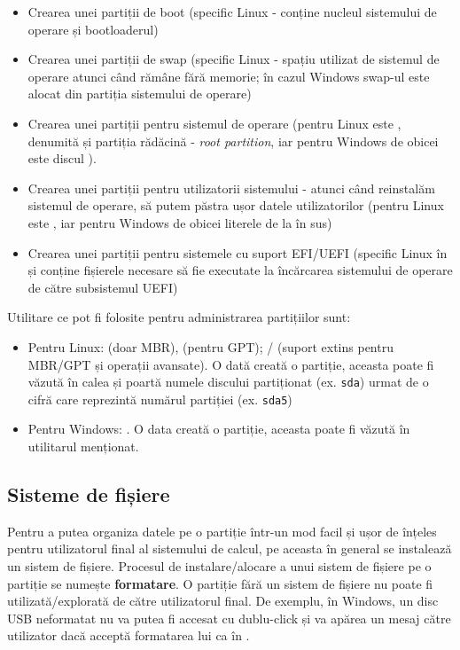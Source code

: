 \begin{itemize}
  \item Crearea unei partiții de boot (specific Linux  - conține
		nucleul sistemului de operare și bootloaderul)
	\item Crearea unei partiții de swap (specific Linux - spațiu utilizat de
		sistemul de operare atunci când rămâne fără memorie; în cazul
		Windows swap-ul este alocat din partiția sistemului de operare)
	\item Crearea unei partiții pentru sistemul de operare (pentru Linux
          este \file{/}, denumită și partiția rădăcină - \textit{root partition}, iar pentru Windows de obicei este
                discul ).
	\item Crearea unei partiții pentru utilizatorii sistemului - atunci când
		reinstalăm sistemul de operare, să putem păstra ușor datele
                utilizatorilor (pentru Linux este , iar pentru Windows de
                obicei literele de la  în sus)
	\item Crearea unei partiții pentru sistemele cu suport EFI/UEFI
          (specific Linux în  și conține fișierele necesare să
		fie executate la încărcarea sistemului de operare de către
		subsistemul UEFI)
\end{itemize}

Utilitare ce pot fi folosite pentru administrarea partițiilor sunt:

\begin{itemize}
  \item Pentru Linux:  (doar MBR),  (pentru GPT); / (suport extins
		pentru MBR/GPT și operații avansate). O dată creată o partiție,
                aceasta poate fi văzută în calea  și poartă numele discului
                partiționat (ex. \texttt{sda}) urmat de o cifră care reprezintă numărul
                partiției (ex. \texttt{sda5})
              \item Pentru Windows: . O data creată o partiție, aceasta
		poate fi văzută în utilitarul menționat.
\end{itemize}

\subsection{Sisteme de fișiere}
\label{sec:storage:fs}

Pentru a putea organiza datele pe o partiție într-un mod facil și ușor de
înțeles pentru utilizatorul final al sistemului de calcul, pe aceasta în general
se instalează un sistem de fișiere. Procesul de instalare/alocare a unui sistem
de fișiere pe o partiție se numește \textbf{formatare}. O partiție fără un sistem de
fișiere nu poate fi utilizată/explorată de către utilizatorul final. De exemplu,
în Windows, un disc USB neformatat nu va putea fi accesat cu dublu-click și va
apărea un mesaj către utilizator dacă acceptă formatarea lui ca în
.

